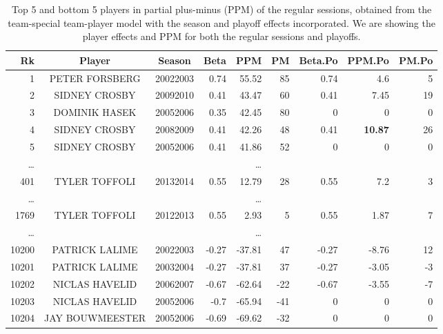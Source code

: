 {
	\renewcommand{\arraystretch}{1.2}
\begin{table}[htbp]
	\centering
	\small
	\begin{tabular}{rccrrrrrr}
		\hline
		Rk    & Player & Season & Beta  & \textbf{PPM}  & PM & Beta.Po & PPM.Po & PM.Po \\
		\hline
		1     & PETER FORSBERG & 20022003 & 0.74  & 55.52 & 85 & 0.74  & 4.6 & 5\\
		2     & SIDNEY CROSBY & 20092010 & 0.41  & 43.47 & 60 & 0.41  & 7.45 & 19\\
		3     & DOMINIK HASEK & 20052006 & 0.35  & 42.45 & 80 & 0     & 0 & 0 \\
		4     & SIDNEY CROSBY & 20082009 & 0.41  & 42.26 & 48 & 0.41  & \textbf{10.87} & 26 \\
		5     & SIDNEY CROSBY & 20052006 & 0.41  & 41.86 & 52 & 0     & 0  & 0\\
		\dots & & & &\dots & & \\
		401 & TYLER TOFFOLI & 20132014 & 0.55 & 12.79 & 28 & 0.55 & 7.2 & 3\\
		\dots & & & &\dots & & \\
		1769 & TYLER TOFFOLI & 20122013 & 0.55 & 2.93 & 5 & 0.55 & 1.87 & 7\\
		\dots & & & &\dots & & \\
		10200 & PATRICK LALIME & 20022003 & -0.27 & -37.81& 47 & -0.27 & -8.76 & 12\\
		10201 & PATRICK LALIME & 20032004 & -0.27 & -37.81& 37 & -0.27 & -3.05 & -3\\
		10202 & NICLAS HAVELID & 20062007 & -0.67 & -62.64 & -22 & -0.67 & -3.55 & -7 \\
		10203 & NICLAS HAVELID & 20052006 & -0.7  & -65.94 & -41 & 0     & 0 & 0\\
		10204 & JAY BOUWMEESTER & 20052006 & -0.69 & -69.62 & -32 & 0     & 0 &0\\
		\hline
	\end{tabular}%
	\caption{Top 5 and bottom 5 players in partial plus-minus (PPM) of the regular sessions, obtained from the team-special team-player model with the season and playoff effects incorporated. We are showing the player effects and PPM for both the regular sessions and playoffs.}\label{tab:goal.ppm.ranking.inter}
\end{table}
}


